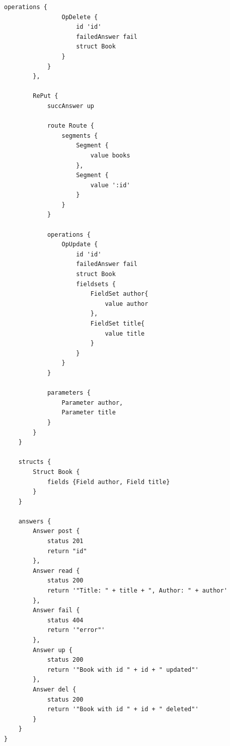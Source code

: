 \documentclass[runningheads]{llncs}
\begin{document}
\begin{center}
\begin{lstlisting}[basicstyle = \scriptsize]
            operations {
                OpDelete {
                    id 'id'
                    failedAnswer fail
                    struct Book
                }
            }
        },

        RePut {
            succAnswer up

            route Route { 
                segments {
                    Segment {
                        value books
                    },
                    Segment {
                        value ':id'
                    }
                } 
            }

            operations {
                OpUpdate {
                    id 'id'
                    failedAnswer fail
                    struct Book
                    fieldsets {
                        FieldSet author{
                            value author
                        },
                        FieldSet title{
                            value title
                        }
                    }
                }
            }

            parameters {
                Parameter author,
                Parameter title
            }
        }
    }

    structs {
        Struct Book {
            fields {Field author, Field title}
        }
    }

    answers {
        Answer post {
            status 201
            return "id"
        },
        Answer read {
            status 200
            return '"Title: " + title + ", Author: " + author'
        },
        Answer fail {
            status 404
            return '"error"'
        },
        Answer up {
            status 200
            return '"Book with id " + id + " updated"'
        },
        Answer del {
            status 200
            return '"Book with id " + id + " deleted"'
        }
    } 
}
\end{lstlisting}
\end{center}
\end{document}
